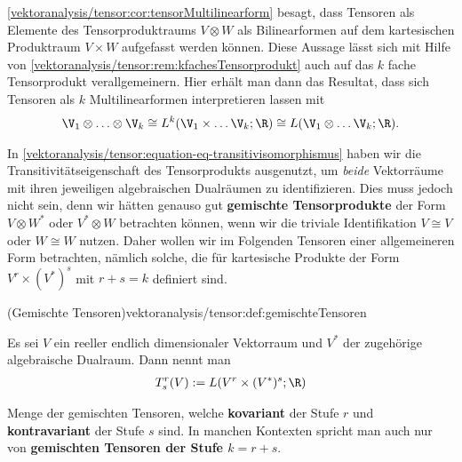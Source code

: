 \documentclass[letterpaper,10pt,english]{jupyterBook}
\begin{document}
\par
\cref{vektoranalysis/tensor:cor:tensorMultilinearform} besagt, dass Tensoren als Elemente des Tensorproduktraums \(V \otimes W\) als Bilinearformen auf dem kartesischen Produktraum \(V \times W\) aufgefasst werden können.
Diese Aussage lässt sich mit Hilfe von \cref{vektoranalysis/tensor:rem:kfachesTensorprodukt} auch auf das \(k\) fache Tensorprodukt verallgemeinern.
Hier erhält man dann das Resultat, dass sich Tensoren als \(k\) Multilinearformen interpretieren lassen mit
\begin{align*}
\V_1\otimes\ldots\otimes\V_k \cong L^k(\V_1\times\ldots\V_k;\R) \cong L(\V_1\otimes\ldots\V_k;\R).
\end{align*}
\par
In \cref{vektoranalysis/tensor:equation-eq-transitivisomorphismus} haben wir die Transitivitätseigenschaft des Tensorprodukts ausgenutzt, um \emph{beide} Vektorräume mit ihren jeweiligen algebraischen Dualräumen zu identifizieren.
Dies muss jedoch nicht sein, denn wir hätten genauso gut \textbf{gemischte Tensorprodukte} der Form \(V \otimes W^\ast\) oder \(V^\ast \otimes W\) betrachten können, wenn wir die triviale Identifikation \(V \cong V\) oder \(W \cong W\) nutzen.
Daher wollen wir im Folgenden Tensoren einer allgemeineren Form betrachten, nämlich solche, die für kartesische Produkte der Form \(V^r\times (V^\ast)^s\) mit \(r+s=k\) definiert sind.
\begin{definition}{(Gemischte Tensoren)}{vektoranalysis/tensor:def:gemischteTensoren}



\par
Es sei \(V\) ein reeller endlich dimensionaler Vektorraum und \(V^\ast\) der zugehörige algebraische Dualraum.
Dann nennt man
\begin{align*}
T^r_s(V) := L(V^r\times (V^\ast)^s; \R)
\end{align*}
\par
Menge der gemischten Tensoren, welche \textbf{kovariant} der Stufe \(r\) und \textbf{kontravariant} der Stufe \(s\) sind.
In manchen Kontexten spricht man auch nur von \textbf{gemischten Tensoren der Stufe \(k=r+s\)}.
\end{definition}
\end{document}
